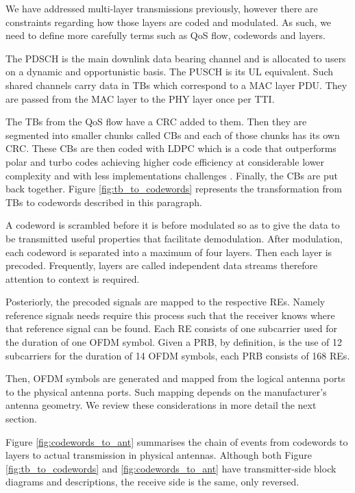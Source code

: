 We have addressed multi-layer transmissions previously, however there are constraints regarding how those layers are coded and modulated. As such, we need to define more carefully terms such as \ac{QoS} flow, codewords and layers.

The \ac{PDSCH} is the main downlink data bearing channel and is allocated to users on a dynamic and opportunistic basis. The \ac{PUSCH} is its \ac{UL} equivalent. Such shared channels carry data in \acp{TB} which correspond to a \ac{MAC} layer \ac{PDU}. They are passed from the \ac{MAC} layer to the \ac{PHY} layer once per \ac{TTI}.

The \acp{TB} from the \ac{QoS} flow have a \ac{CRC} added to them. Then they are segmented into smaller chunks called \acp{CB} and each of those chunks has its own \ac{CRC}. These \acp{CB} are then coded with \ac{LDPC} which is a code that outperforms polar and turbo codes achieving higher code efficiency at considerable lower complexity and with less implementations challenges \cite{qualcomm_innovative_five}. Finally, the \acp{CB} are put back together. Figure \ref{fig:tb_to_codewords} represents the transformation from \acp{TB} to codewords described in this paragraph.


A codeword is scrambled before it is before modulated so as to give the data to be transmitted useful properties that facilitate demodulation. After modulation, each codeword is separated into a maximum of four layers. Then each layer is precoded. Frequently, layers are called independent data streams therefore attention to context is required.

Posteriorly, the precoded signals are mapped to the respective \acp{RE}. Namely reference signals needs require this process such that the receiver knows where that reference signal can be found. Each \ac{RE} consists of one subcarrier used for the duration of one \ac{OFDM} symbol. Given a PRB, by definition, is the use of 12 subcarriers for the duration of 14 OFDM symbols, each PRB consists of 168 \acp{RE}.

Then, \ac{OFDM} symbols are generated and mapped from the logical antenna ports to the physical antenna ports. Such mapping depends on the manufacturer's antenna geometry. We review these considerations in more detail the next section.

Figure \ref{fig:codewords_to_ant} summarises the chain of events from codewords to layers to actual transmission in physical antennas. Although both Figure \ref{fig:tb_to_codewords} and \ref{fig:codewords_to_ant} have transmitter-side block diagrams and descriptions, the receive side is the same, only reversed.

